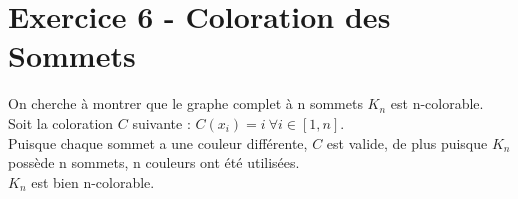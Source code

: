 
\section{Exercice 6 - Coloration des Sommets}\label{ex6}
On cherche \`a montrer que le graphe complet \`a n sommets $K_n$ est n-colorable.\\
Soit la coloration $C$ suivante :
$C(x_i) = i\ \forall i \in [1,n]$.\\
Puisque chaque sommet a une couleur diff\'erente, $C$ est valide, de plus puisque $K_n$
poss\`ede n sommets, n couleurs ont \'et\'e utilis\'ees.\\
$K_n$ est bien n-colorable.

